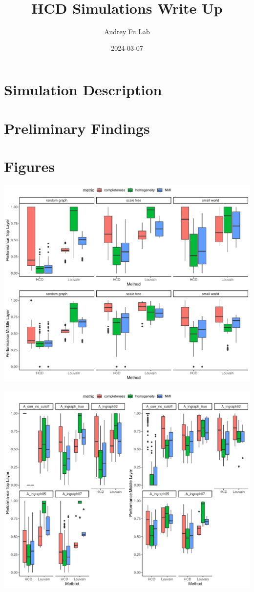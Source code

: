 \documentclass[
]{article}
\title{HCD Simulations Write Up}
\author{Audrey Fu Lab}
\date{2024-03-07}
\begin{document}
\maketitle

\section*{Simulation Description}

\section*{Preliminary Findings}

\newpage
\section*{Figures}

\includegraphics{Lab_report_3_13_2024_files/figure-latex/unnamed-chunk-1-1.pdf}

\includegraphics{Lab_report_3_13_2024_files/figure-latex/unnamed-chunk-2-1.pdf}
\end{document}
